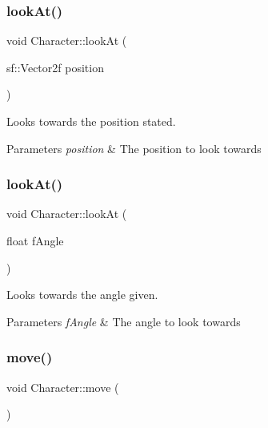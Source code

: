 \subsubsection{\texorpdfstring{look\+At()}{lookAt()}\hspace{0.1cm}{\footnotesize\ttfamily [1/2]}}
{\footnotesize\ttfamily void Character\+::look\+At (\begin{DoxyParamCaption}\item[{sf\+::\+Vector2f}]{position }\end{DoxyParamCaption})}



Looks towards the position stated. 


\begin{DoxyParams}{Parameters}
{\em position} & The position to look towards \\
\hline
\end{DoxyParams}
\mbox{\label{class_character_ac8c9b33398ecc1fd527e4d392b68bb5e}} 
\subsubsection{\texorpdfstring{look\+At()}{lookAt()}\hspace{0.1cm}{\footnotesize\ttfamily [2/2]}}
{\footnotesize\ttfamily void Character\+::look\+At (\begin{DoxyParamCaption}\item[{float}]{f\+Angle }\end{DoxyParamCaption})}



Looks towards the angle given. 


\begin{DoxyParams}{Parameters}
{\em f\+Angle} & The angle to look towards \\
\hline
\end{DoxyParams}
\mbox{\label{class_character_a639f0dfe68079c01cb702073a6451659}} 
\subsubsection{\texorpdfstring{move()}{move()}}
{\footnotesize\ttfamily void Character\+::move (\begin{DoxyParamCaption}{ }\end{DoxyParamCaption})}



